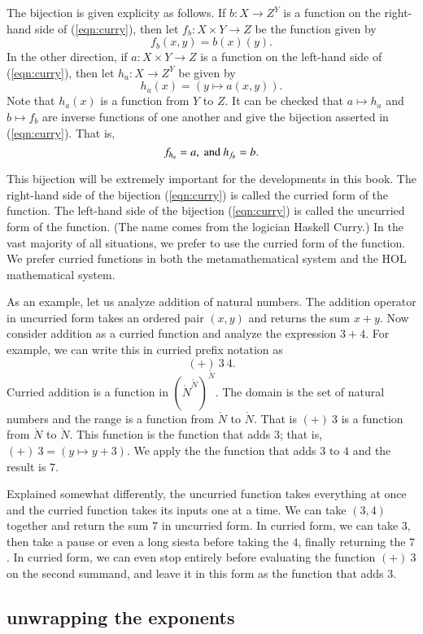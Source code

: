 \documentclass[cup9a]{cupbook}
\begin{document}
The bijection is given explicity as follows.  If $b:X\to Z^Y$ is a function
on the right-hand side of (\ref{eqn:curry}), then let $f_b:X\times Y\to Z$
be the function given by 
$$
f_b(x,y) = b(x) (y).
$$
In the other direction, if $a:X\times Y\to Z$ is a function on the left-hand side of (\ref{eqn:curry}), then let $h_a:X\to Z^Y$ be given by
$$
h_a(x) = (y\mapsto a(x,y)).
$$
Note that $h_a(x)$ is a function from $Y$ to $Z$.
It can be  checked that $a\mapsto h_a$ and $b\mapsto f_b$ are inverse functions of one another and give the bijection asserted in (\ref{eqn:curry}).
That is,
$$
f_{h_a} = a,\hbox{ and } h_{f_b} = b.
$$

This bijection will be extremely important for the developments in this book.  The right-hand side of the bijection (\ref{eqn:curry}) is called the curried form of the function.  The left-hand side of the bijection (\ref{eqn:curry}) is called the uncurried form of the function.  (The name comes from the logician Haskell Curry.)   In the vast majority of all situations, we prefer to use the curried form of the function.  We prefer curried functions in both the metamathematical system and the HOL mathematical system.

As an example, let us analyze addition of natural numbers.  The addition operator in uncurried form takes an ordered pair $(x,y)$ and
returns the sum $x+y$.   Now consider addition as a curried function and analyze the expression $3+4$.  For example, we can write this in curried prefix notation as
$$
(+)~3~4.
$$
Curried addition is a function in $(\ring{N}^{\ring{N}})^{\ring{N}}$.  The domain
is the set of natural numbers and the range is a function from $\ring{N}$ to $\ring{N}$.
That is $(+)~3$ is a function from $\ring{N}$ to $\ring{N}$.  This function is the function that adds $3$; that is, $(+)~3 = (y\mapsto y+3)$.  We apply the
the function that adds $3$ to $4$ and the result is $7$.

Explained somewhat differently, the uncurried function takes everything at once and the curried function takes its inputs one at a time.  We can take $(3,4)$ together and return the sum $7$ in uncurried form.  In curried form, we can take $3$, then take a pause or even a long siesta before taking the $4$, finally returning the $7$.  In curried form, we can even stop entirely before evaluating the function $(+)~3$ on the second summand, and leave it in this form as the function that adds $3$.

\subsection{unwrapping the exponents}
\end{document}
